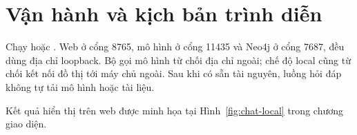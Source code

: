 \section{Vận hành và kịch bản trình diễn}
Chạy  hoặc . Web ở cổng 8765, mô hình ở cổng 11435 và Neo4j ở cổng 7687, đều dùng địa chỉ loopback. Bộ gọi mô hình từ chối địa chỉ ngoài; chế độ local cũng từ chối kết nối đồ thị tới máy chủ ngoài. Sau khi có sẵn tài nguyên, luồng hỏi đáp không tự tải mô hình hoặc tài liệu.

Kết quả hiển thị trên web được minh họa tại Hình~\ref{fig:chat-local} trong chương giao diện.
